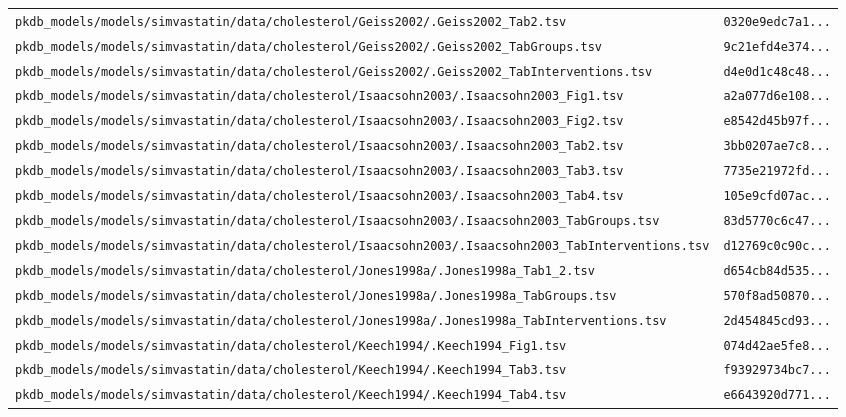 \documentclass{article}
\begin{document}
\begin{longtable}{ll}
\texttt{pkdb\_models/models/simvastatin/data/cholesterol/Geiss2002/.Geiss2002\_Tab2.tsv} & \texttt{0320e9edc7a1...} \\
\texttt{pkdb\_models/models/simvastatin/data/cholesterol/Geiss2002/.Geiss2002\_TabGroups.tsv} & \texttt{9c21efd4e374...} \\
\texttt{pkdb\_models/models/simvastatin/data/cholesterol/Geiss2002/.Geiss2002\_TabInterventions.tsv} & \texttt{d4e0d1c48c48...} \\
\texttt{pkdb\_models/models/simvastatin/data/cholesterol/Isaacsohn2003/.Isaacsohn2003\_Fig1.tsv} & \texttt{a2a077d6e108...} \\
\texttt{pkdb\_models/models/simvastatin/data/cholesterol/Isaacsohn2003/.Isaacsohn2003\_Fig2.tsv} & \texttt{e8542d45b97f...} \\
\texttt{pkdb\_models/models/simvastatin/data/cholesterol/Isaacsohn2003/.Isaacsohn2003\_Tab2.tsv} & \texttt{3bb0207ae7c8...} \\
\texttt{pkdb\_models/models/simvastatin/data/cholesterol/Isaacsohn2003/.Isaacsohn2003\_Tab3.tsv} & \texttt{7735e21972fd...} \\
\texttt{pkdb\_models/models/simvastatin/data/cholesterol/Isaacsohn2003/.Isaacsohn2003\_Tab4.tsv} & \texttt{105e9cfd07ac...} \\
\texttt{pkdb\_models/models/simvastatin/data/cholesterol/Isaacsohn2003/.Isaacsohn2003\_TabGroups.tsv} & \texttt{83d5770c6c47...} \\
\texttt{pkdb\_models/models/simvastatin/data/cholesterol/Isaacsohn2003/.Isaacsohn2003\_TabInterventions.tsv} & \texttt{d12769c0c90c...} \\
\texttt{pkdb\_models/models/simvastatin/data/cholesterol/Jones1998a/.Jones1998a\_Tab1\_2.tsv} & \texttt{d654cb84d535...} \\
\texttt{pkdb\_models/models/simvastatin/data/cholesterol/Jones1998a/.Jones1998a\_TabGroups.tsv} & \texttt{570f8ad50870...} \\
\texttt{pkdb\_models/models/simvastatin/data/cholesterol/Jones1998a/.Jones1998a\_TabInterventions.tsv} & \texttt{2d454845cd93...} \\
\texttt{pkdb\_models/models/simvastatin/data/cholesterol/Keech1994/.Keech1994\_Fig1.tsv} & \texttt{074d42ae5fe8...} \\
\texttt{pkdb\_models/models/simvastatin/data/cholesterol/Keech1994/.Keech1994\_Tab3.tsv} & \texttt{f93929734bc7...} \\
\texttt{pkdb\_models/models/simvastatin/data/cholesterol/Keech1994/.Keech1994\_Tab4.tsv} & \texttt{e6643920d771...} \\

\end{longtable}
\end{document}
